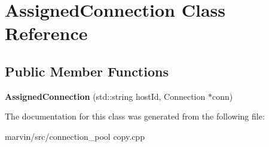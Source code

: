 \hypertarget{class_assigned_connection}{}\section{Assigned\+Connection Class Reference}
\label{class_assigned_connection}
\subsection*{Public Member Functions}
\begin{DoxyCompactItemize}
\item 
\mbox{\label{class_assigned_connection_a668e703d7107c4782dfd43e0f1ef81f7}} 
{\bfseries Assigned\+Connection} (std\+::string host\+Id, Connection $\ast$conn)
\end{DoxyCompactItemize}


The documentation for this class was generated from the following file\+:\begin{DoxyCompactItemize}
\item 
marvin/src/connection\+\_\+pool copy.\+cpp\end{DoxyCompactItemize}
